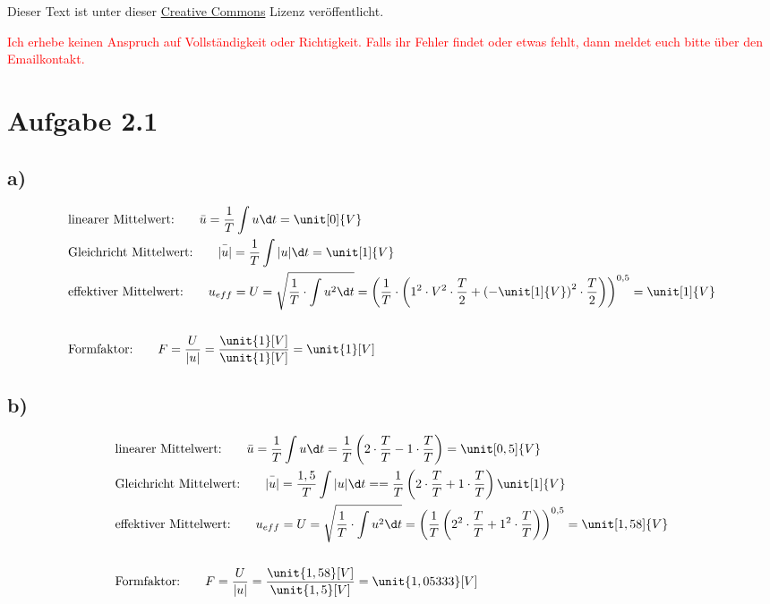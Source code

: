 




\maketitle

Dieser Text ist unter dieser \href{http://creativecommons.org/licenses/by-nc-sa/4.0/}{Creative Commons} Lizenz veröffentlicht.

\textcolor{red}{Ich erhebe keinen Anspruch auf Vollständigkeit oder Richtigkeit. Falls ihr Fehler findet oder etwas fehlt, dann meldet euch bitte über den Emailkontakt.}

\tableofcontents


\newpage

\section{Aufgabe 2.1}

\subsection*{a)}

\begin{align*}
	&\text{linearer Mittelwert:} \qquad \bar{u} = \frac{1}{T} \int u \d t = \unit[0]{V} \\
	&\text{Gleichricht Mittelwert:} \qquad \bar{|u|} = \frac{1}{T} \int |u| \d t = \unit[1]{V} \\
	&\text{effektiver Mittelwert:} \qquad u_{eff} = U = \sqrt{\frac{1}{T} \cdot \int u^2 \d t} = \left(\frac{1}{T} \cdot \left( 1^2 \cdot V^2 \cdot \frac{T}{2} + \left(- \unit[1]{V} \right)^2 \cdot \frac{T}{2} \right) \right)^{0,5} = \unit[1]{V} \\
	\hfill \\
	&\text{Formfaktor:} \qquad F = \frac{U}{|u|} = \frac{\unit{1}[V]}{\unit{1}[V]} = \unit{1}[V]
\end{align*}

\subsection*{b)}

\begin{align*}
	&\text{linearer Mittelwert:} \qquad \bar{u} = \frac{1}{T} \int u \d t = \frac{1}{T} \left(2 \cdot \frac{T}{T} - 1 \cdot \frac{T}{T} \right) = \unit[0,5]{V} \\
	&\text{Gleichricht Mittelwert:} \qquad \bar{|u|} = \frac{1,5}{T} \int |u| \d t = = \frac{1}{T} \left(2 \cdot \frac{T}{T} + 1 \cdot \frac{T}{T} \right) \unit[1]{V} \\
	&\text{effektiver Mittelwert:} \qquad u_{eff} = U = \sqrt{\frac{1}{T} \cdot \int u^2 \d t} = \left(\frac{1}{T} \left(2^2 \cdot \frac{T}{T} + 1^2 \cdot \frac{T}{T} \right) \right)^{0,5} = \unit[1,58]{V} \\
	\hfill \\
	&\text{Formfaktor:} \qquad F = \frac{U}{|u|} = \frac{\unit{1,58}[V]}{\unit{1,5}[V]} = \unit{1,05333}[V]
\end{align*}



